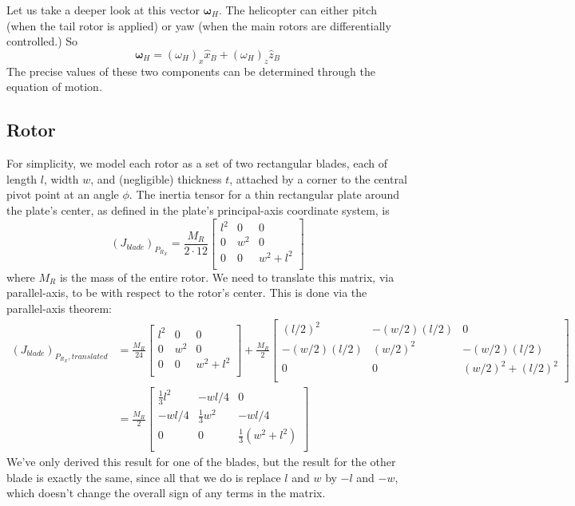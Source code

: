 \documentclass[10pt,letterpaper,final]{article}
\begin{document}
Let us take a deeper look at this vector $\bm \omega_H$. The helicopter can either pitch (when the tail rotor is applied) or yaw (when the main rotors are differentially controlled.) So
$$\bm \omega_H = (\omega_{H})_x \hat{x}_B + (\omega_{H})_z \hat{z}_B$$
The precise values of these two components can be determined through the equation of motion.
\subsection{Rotor}
For simplicity, we model each rotor as a set of two rectangular blades, each of length $l$, width $w$, and (negligible) thickness $t$, attached by a corner to the central pivot point at an angle $\phi$. The inertia tensor for a thin rectangular plate around the plate's center, as defined in the plate's principal-axis coordinate system, is
$$(J_{blade})_{P_{R_X}} = \frac{M_R}{2 \cdot 12}
\begin{bmatrix}
l^2  & 0 & 0 \\
0 & w^2 & 0 \\
0 & 0 & w^2 + l^2 \\
\end{bmatrix}
$$
where $M_R$ is the mass of the entire rotor. We need to translate this matrix, via parallel-axis, to be with respect to the rotor's center. This is done via the parallel-axis theorem:
\begin{align*}
(J_{blade})_{P_{R_X}, translated} &= 
\frac{M_R}{24} \begin{bmatrix}
l^2  & 0 & 0 \\
0 & w^2 & 0 \\
0 & 0 & w^2 + l^2 \\
\end{bmatrix} + 
\frac{M_R}{2} \begin{bmatrix}
(l/2)^2  & -(w/2)(l/2) & 0 \\
-(w/2)(l/2) & (w/2)^2 &  -(w/2)(l/2) \\
0 & 0 & (w/2)^2 + (l/2)^2 \\
\end{bmatrix} \\
&= 
\frac{M_R}{2} \begin{bmatrix}
\frac{1}{3}l^2 & -wl/4 & 0 \\
-wl/4 & \frac{1}{3}w^2 & -wl/4 \\
0 & 0 & \frac{1}{3}(w^2 + l^2) \\
\end{bmatrix}
\end{align*}
We've only derived this result for one of the blades, but the result for the other blade is exactly the same, since all that we do is replace $l$ and $w$ by $-l$ and $-w$, which doesn't change the overall sign of any terms in the matrix.
\end{document}
